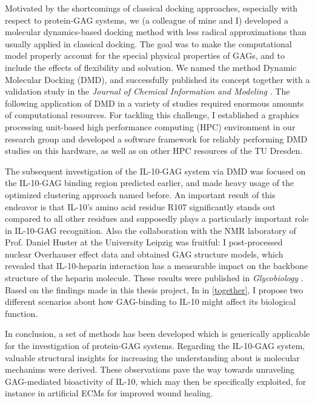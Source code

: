 Motivated by the shortcomings of classical docking approaches, especially with
respect to protein-GAG systems, we (a colleague of mine and I) developed a
molecular dynamics-based docking method with less radical approximations than
usually applied in classical docking. The goal was to make the computational
model properly account for the special physical properties of GAGs, and to
include the effects of flexibility and solvation. We named the method Dynamic
Molecular Docking (DMD), and successfully published its concept together with a
validation study in the \textit{Journal of Chemical Information and
Modeling} \cite{dmd_samsonov_gehrcke_2014}. The following application of DMD in a
variety of studies required enormous amounts of computational resources. For
tackling this challenge, I established a graphics processing unit-based high
performance computing (HPC) environment in our research group and developed a
software framework for reliably performing DMD studies on this hardware, as well
as on other HPC resources of the TU Dresden.

The subsequent investigation of the IL-10-GAG system via DMD was focused on the
IL-10-GAG binding region predicted earlier, and made heavy usage of the
optimized clustering approach named before. An important result of this endeavor
is that IL-10's amino acid residue R107 significantly stands out compared to all
other residues and supposedly plays a particularly important role in IL-10-GAG
recognition. Also the collaboration with the NMR laboratory of Prof. Daniel
Huster at the University Leipzig was fruitful: I post-processed nuclear
Overhauser effect data and obtained GAG structure models, which revealed that
IL-10-heparin interaction has a measurable impact on the backbone structure of
the heparin molecule. These results were published in \textit{Glycobiology}
\cite{kuenze_gehrcke_2014}. Based on the findings made in this thesis project,
In in \cref{together}, I propose two different scenarios about how GAG-binding
to IL-10 might affect its biological function.

In conclusion, a set of methods has been developed which is generically
applicable for the investigation of protein-GAG systems. Regarding the IL-10-GAG
system, valuable structural insights for increasing the understanding about is
molecular mechanims were derived. These observations pave the way towards
unraveling GAG-mediated bioactivity of IL-10, which may then be specifically
exploited, for instance in artificial ECMs for improved wound healing.

